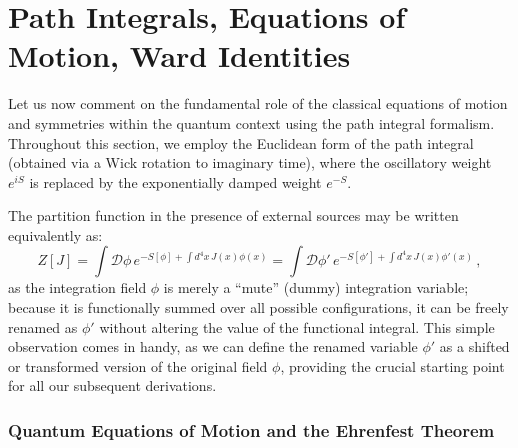 \section{Path Integrals, Equations of Motion, Ward Identities}

Let us now comment on the fundamental role of the classical equations of motion and symmetries within the quantum context using the path integral formalism. Throughout this section, we employ the Euclidean form of the path integral (obtained via a Wick rotation to imaginary time), where the oscillatory weight \(e^{iS}\) is replaced by the exponentially damped weight \(e^{-S}\).

The partition function in the presence of external sources may be written equivalently as:
\begin{equation} \label{eq:path_integral_mute_variable}
    Z[J] = \int \mathcal{D}\phi \, e^{-S[\phi] + \int d^4x \, J(x)\phi(x)} = \int \mathcal{D}\phi' \, e^{-S[\phi'] + \int d^4x \, J(x)\phi'(x)} \, ,
\end{equation}
as the integration field \(\phi\) is merely a ``mute'' (dummy) integration variable; because it is functionally summed over all possible configurations, it can be freely renamed as \(\phi'\) without altering the value of the functional integral. This simple observation comes in handy, as we can define the renamed variable \(\phi'\) as a shifted or transformed version of the original field \(\phi\), providing the crucial starting point for all our subsequent derivations.

\subsubsection{Quantum Equations of Motion and the Ehrenfest Theorem}

